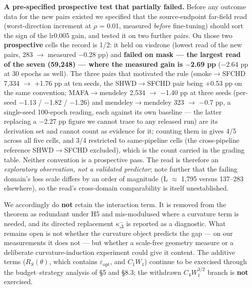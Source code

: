 \documentclass[pdflatex,sn-mathphys-ay]{sn-jnl}
\begin{document}
\textbf{A pre-specified prospective test that partially failed.} Before any outcome data for the new pairs existed we specified that the source-endpoint far-field read (worst-direction increment at \ensuremath{\rho} = 0.01, measured \emph{before} fine-tuning) should sort the sign of the lr0.005 gain, and tested it on two further pairs. On those two \textbf{prospective} cells the record is 1/2: it held on visdrone (lowest read of the new pairs, 283 \ensuremath{\rightarrow} measured \ensuremath{-}0.28 pp) and \textbf{failed on mask --- the largest read of the seven (59,248) --- where the measured gain is \ensuremath{-}2.69 pp} (\ensuremath{-}2.64 pp at 30 epochs as well). The three pairs that motivated the rule (smoke\ensuremath{\rightarrow}SFCHD 7,334 \ensuremath{\rightarrow} +1.76 pp at ten seeds, the SHWD\ensuremath{\rightarrow}SFCHD pair being +0.53 pp on the same convention; MAFA\ensuremath{\rightarrow}mendeley 2,534 \ensuremath{\rightarrow} \ensuremath{-}1.40 pp at three seeds (per-seed \ensuremath{-}1.13 / \ensuremath{-}1.82 / \ensuremath{-}1.26) and mendeley\ensuremath{\rightarrow}mendeley 323 \ensuremath{\rightarrow} \ensuremath{-}0.7 pp, a single-seed 100-epoch reading, each against its own baseline --- the latter replacing a \ensuremath{-}2.27 pp figure we cannot trace to any released run) are its derivation set and cannot count as evidence for it; counting them in gives 4/5 across all five cells, and 3/4 restricted to same-pipeline cells (the cross-pipeline reference SHWD\ensuremath{\rightarrow}SFCHD excluded), which is the count carried in the grading table. Neither convention is a prospective pass. The read is therefore an \emph{exploratory observation, not a validated predictor}; note further that the failing domain's loss scale differs by an order of magnitude (L \ensuremath{\approx} 1,795 versus 137--283 elsewhere), so the read's cross-domain comparability is itself unestablished.

We accordingly do \textbf{not} retain the interaction term. It is removed from the theorem as redundant under H5 and mis-modulused where a curvature term is needed, and its directed replacement $\kappa^-_\Delta$ is reported as a diagnostic. What remains open is not whether the curvature object predicts the gap --- on our measurements it does not --- but whether a scale-free geometry measure or a deliberate curvature-induction experiment could give it content. The additive terms ($R_S(\theta)$, which contains $\varepsilon_{\mathrm{opt}}$, and $C_1W_1$) continue to be exercised through the budget--strategy analysis of \S{}5 and \S{}8.3; the withdrawn $C_4W_1^{3/2}$ branch is \textbf{not} exercised.
\end{document}
